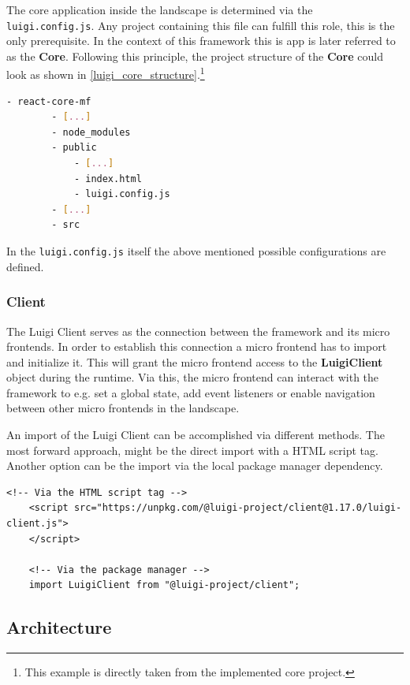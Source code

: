 The core application inside the landscape is determined via the \texttt{luigi.config.js}. Any project containing this file can fulfill this role, this is the only prerequisite. In the context of this framework this is app is later referred to as the \textbf{Core}.
Following this principle, the project structure of the \textbf{Core} could look as shown in \ref{luigi_core_structure}.\footnote{This example is directly taken from the implemented core project.}  

\begin{lstlisting}[language=Bash, caption=Project structure for a Luigi Core application including the \texttt{luigi.config.js}, label=luigi_core_structure]
	- react-core-mf
		- [...]
		- node_modules
		- public
			- [...]
			- index.html
			- luigi.config.js
		- [...]
		- src
\end{lstlisting}

In the \texttt{luigi.config.js} itself the above mentioned possible configurations are defined.\cite{luigi_doc_core}

\subsubsection{Client}

The Luigi Client serves as the connection between the framework and its micro frontends. In order to establish this connection a micro frontend has to import and initialize it. This will grant the micro frontend access to the \textbf{LuigiClient} object during the runtime. Via this, the micro frontend can interact with the framework to e.g. set a global state, add event listeners or enable navigation between other micro frontends in the landscape.

An import of the Luigi Client can be accomplished via different methods. The most forward approach, might be the direct import with a HTML script tag. Another option can be the import via the local package manager dependency.\cite{luigi_client}

\begin{lstlisting}[caption=Import methods of the Luigi Client]
	<!-- Via the HTML script tag -->
	<script src="https://unpkg.com/@luigi-project/client@1.17.0/luigi-client.js">
	</script>
	
	<!-- Via the package manager -->
	import LuigiClient from "@luigi-project/client";
\end{lstlisting}

\subsection{Architecture}

